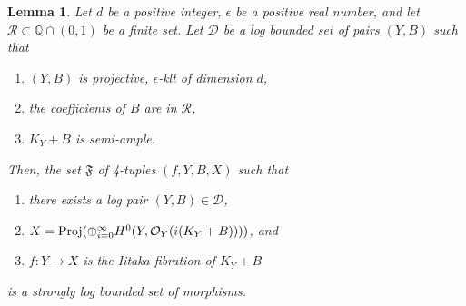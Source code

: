 \documentclass[11pt]{ip-journal}
\newtheorem{lemma}[theorem]{Lemma}
\theoremstyle{definition}
\begin{document}
\begin{lemma}
\label{bound.morph.lemma}
Let $d$ be a positive integer, $\epsilon$ be a positive real number, and let $\mathcal R \subset \mathbb{Q} \cap (0,1)$ be a finite set.
\newline
Let $\mathcal D$ be a log bounded set of pairs $(Y, B)$ such that
\begin{enumerate}
    \item 
$(Y, B)$ is projective, $\epsilon$-klt of dimension $d$,
    
    \item
the coefficients of $B$ are in $\mathcal{R}$,

    \item 
$K_Y+B$ is semi-ample.
\end{enumerate}
\noindent
Then, the set $\mathfrak F$ of 4-tuples $(f, Y, B, X)$ such that
\begin{enumerate}
    \item[(i)]
there exists a log pair $(Y, B) \in \mathcal D$,

    \item[(ii)]
$X= {\rm Proj}(\oplus_{i=0}^\infty H^0(Y, \mathcal{O}_Y(i(K_Y+B))))$, and

    \item[(iii)] 
$f \colon Y \to X$ is the Iitaka fibration of $K_Y+B$
\end{enumerate}
is a strongly log bounded set of morphisms.
\end{lemma}
\end{document}
